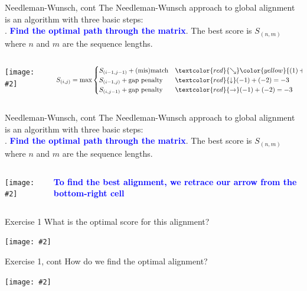 \documentclass{beamer}
\renewcommand{\c}[1]{\begin{center}#1\end{center}}
\newcommand{\blu}[1]{\textcolor{blue}{\textbf{#1}}}
\newcommand{\gr}[2][.95]{\c{\texttt{[image: \#2]}}}
\begin{document}
\begin{frame}{Needleman-Wunsch, cont}
The Needleman-Wunsch approach to global alignment is an algorithm with three basic steps:\\
. \blu{Find the optimal path through the matrix}. The best score is $S_{(n,m)}$ where $n$ and $m$ are the sequence lengths.
\begin{columns}
\begin{column}{0.5\textwidth}
    \gr{l3_figs/s36_nw.png}
\end{column}
\begin{column}{0.5\textwidth}
\tiny
\[
S_{(i,j)} = \max \begin{cases}
    S_{(i-1,j-1)} + \text{(mis)match} &\textcolor{red}{\searrow} \color{yellow}{(1) + (1) = 2 \text{(MAX)}}\\
    S_{(i-1,j)} + \text{gap penalty} &\textcolor{red}{\downarrow} (-1) + (-2) = -3\\
    S_{(i,j-1)} + \text{gap penalty} &\textcolor{red}{\rightarrow} (-1) + (-2) = -3
\end{cases}
\]
\end{column}
\end{columns}
\end{frame}

\begin{frame}{Needleman-Wunsch, cont}
The Needleman-Wunsch approach to global alignment is an algorithm with three basic steps:\\
. \blu{Find the optimal path through the matrix}. The best score is $S_{(n,m)}$ where $n$ and $m$ are the sequence lengths.
\begin{columns}
\begin{column}{0.5\textwidth}
    \gr{l3_figs/s39_nw.png}
\end{column}
\begin{column}{0.5\textwidth}
\blu{To find the best alignment, we retrace our arrow from the bottom-right cell}
\end{column}
\end{columns}
\end{frame}

\begin{frame}{Exercise 1}
What is the optimal score for this alignment?
\gr[0.5]{l3_figs/s40_nw.png}
\end{frame}

\begin{frame}{Exercise 1, cont}
How do we find the optimal alignment?
\gr[0.5]{l3_figs/s41_nw.png}
\end{frame}
\end{document}
